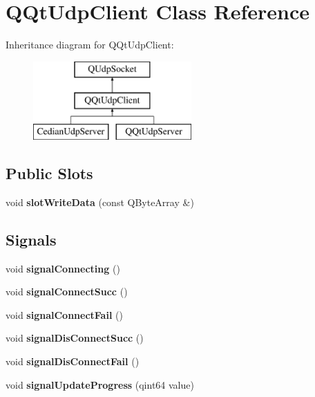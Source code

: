 \hypertarget{class_q_qt_udp_client}{}\section{Q\+Qt\+Udp\+Client Class Reference}
\label{class_q_qt_udp_client}
Inheritance diagram for Q\+Qt\+Udp\+Client\+:\begin{figure}[H]
\begin{center}
\leavevmode
\includegraphics[height=3.000000cm]{class_q_qt_udp_client}
\end{center}
\end{figure}
\subsection*{Public Slots}
\begin{DoxyCompactItemize}
\item 
\mbox{\label{class_q_qt_udp_client_a669b2d4675fdbfe0254f6a80383ebba8}} 
void {\bfseries slot\+Write\+Data} (const Q\+Byte\+Array \&)
\end{DoxyCompactItemize}
\subsection*{Signals}
\begin{DoxyCompactItemize}
\item 
\mbox{\label{class_q_qt_udp_client_aa527d85be364fc6f7924378f2342a36e}} 
void {\bfseries signal\+Connecting} ()
\item 
\mbox{\label{class_q_qt_udp_client_a4a4d97cf2aabf4d9e9d9eb2e6023cf5c}} 
void {\bfseries signal\+Connect\+Succ} ()
\item 
\mbox{\label{class_q_qt_udp_client_ae5bb43242e6e798fdb32717f4393470a}} 
void {\bfseries signal\+Connect\+Fail} ()
\item 
\mbox{\label{class_q_qt_udp_client_a15ba1e172184bb67aa880dbcc8e231c9}} 
void {\bfseries signal\+Dis\+Connect\+Succ} ()
\item 
\mbox{\label{class_q_qt_udp_client_a98d5f9f61a34a481dd02ffa841d8e736}} 
void {\bfseries signal\+Dis\+Connect\+Fail} ()
\item 
\mbox{\label{class_q_qt_udp_client_a1c3eed1af68e01129cb7cd8f94d4fd94}} 
void {\bfseries signal\+Update\+Progress} (qint64 value)
\end{DoxyCompactItemize}

